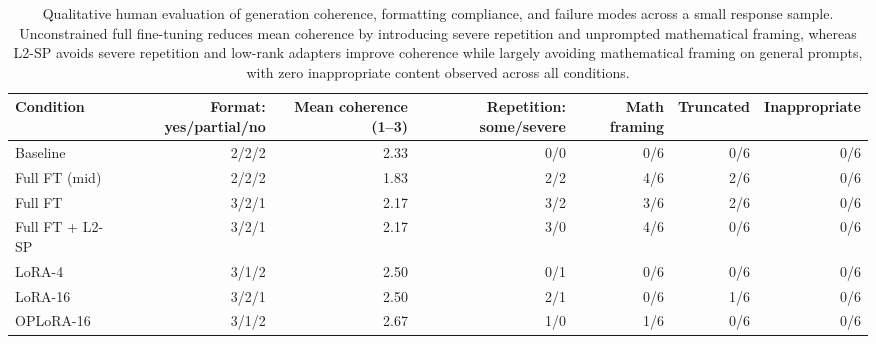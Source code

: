 \begin{table}[t]
\centering
\small
\caption{Qualitative human evaluation of generation coherence, formatting compliance, and failure modes across a small response sample. Unconstrained full fine-tuning reduces mean coherence by introducing severe repetition and unprompted mathematical framing, whereas L2-SP avoids severe repetition and low-rank adapters improve coherence while largely avoiding mathematical framing on general prompts, with zero inappropriate content observed across all conditions.}
\label{tab:t1-annotation}
\begin{tabular}{lrrrrrr}
\toprule
Condition & Format: yes/partial/no & Mean coherence (1–3) & Repetition: some/severe & Math framing & Truncated & Inappropriate \\
\midrule
Baseline & 2/2/2 & 2.33 & 0/0 & 0/6 & 0/6 & 0/6 \\
Full FT (mid) & 2/2/2 & 1.83 & 2/2 & 4/6 & 2/6 & 0/6 \\
Full FT & 3/2/1 & 2.17 & 3/2 & 3/6 & 2/6 & 0/6 \\
Full FT + L2-SP & 3/2/1 & 2.17 & 3/0 & 4/6 & 0/6 & 0/6 \\
LoRA-4 & 3/1/2 & 2.50 & 0/1 & 0/6 & 0/6 & 0/6 \\
LoRA-16 & 3/2/1 & 2.50 & 2/1 & 0/6 & 1/6 & 0/6 \\
OPLoRA-16 & 3/1/2 & 2.67 & 1/0 & 1/6 & 0/6 & 0/6 \\
\bottomrule
\end{tabular}
\end{table}
